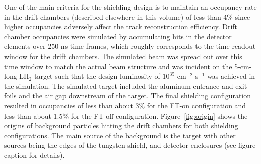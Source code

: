 One of the main criteria for the shielding design is to maintain an occupancy rate in the drift chambers (described elsewhere in this volume)
of less than 4\% since higher occupancies adversely affect the track reconstruction efficiency.  Drift chamber occupancies were simulated 
by accumulating hits in the detector elements over 250-ns time frames, which roughly corresponds to the time readout window for the drift 
chambers. The simulated beam was spread out over this time window to match the actual beam structure and was incident on the 5-cm-long 
LH$_2$ target such that the design luminosity of $10^{35}$ cm$^{-2}$ s$^{-1}$ was achieved in the simulation. The simulated target 
included the aluminum entrance and exit foils and the air gap downstream of the target. The final shielding configuration resulted in 
occupancies of less than about 3\% for the FT-on configuration and less than about 1.5\% for the FT-off configuration.  Figure~\ref{fig:origin} 
shows the origins of background particles hitting the drift chambers for both shielding configurations. The main source of the background 
is the target with other sources being the edges of the tungsten shield, and detector enclosures (see figure caption for details). 


